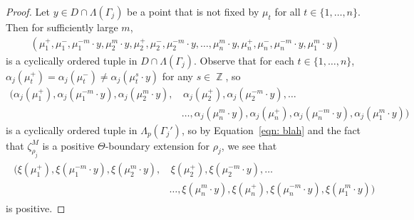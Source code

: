 \documentclass{amsart}
\theoremstyle{plain}
\theoremstyle{definition}
\DeclareMathOperator{\Zb}{\mathbb{Z}}
\newcommand{\1}{\mathbf{1}}
\begin{document}
\begin{proof}
Let $y\in D\cap\Lambda(\Gamma_j)$ be a point that is not fixed by $\mu_t$ for all $t\in\{1,\dots,n\}$. Then for sufficiently large $m$, 
\begin{align*}
(\mu_1^+,\mu_1^-,\mu_1^{-m}\cdot y,\mu_2^m\cdot y,\mu_2^+,\mu_2^-,\mu_2^{-m}\cdot y,\dots,\mu_n^m\cdot y,\mu_n^+,\mu_n^-,\mu_n^{-m}\cdot y,\mu_1^m\cdot y)    
\end{align*}
is a cyclically ordered tuple in $D\cap \Lambda(\Gamma_j)$. Observe that for each $t\in\{1,\dots,n\}$, $\alpha_j(\mu_t^+)=\alpha_j(\mu_t^-)\neq\alpha_j(\mu_t^s\cdot y)$ for any $s\in\Zb$, so
\begin{align*}
\big(\alpha_j(\mu_1^+),\alpha_j(\mu_1^{-m}\cdot y),\alpha_j(\mu_2^m\cdot y),&\,\alpha_j(\mu_2^+),\alpha_j(\mu_2^{-m}\cdot y),\dots\\
&\dots,\alpha_j(\mu_n^m\cdot y),\alpha_j(\mu_n^+),\alpha_j(\mu_n^{-m}\cdot y),\alpha_j(\mu_1^m\cdot y)\big)
\end{align*}
is a cyclically ordered tuple in $\Lambda_p(\Gamma_j')$, so by Equation~\eqref{eqn: blah} and the fact that $\zeta_{\rho_j}^M$ is a positive $\Theta$-boundary extension for $\rho_j$, we see that
\begin{align}\label{eqn: positive1}
\begin{split}
\big(\xi(\mu_1^+),\xi(\mu_1^{-m}\cdot y),\xi(\mu_2^m\cdot y),&\,\xi(\mu_2^+),\xi(\mu_2^{-m}\cdot y),\dots\\
&\dots,\xi(\mu_n^m\cdot y),\xi(\mu_n^+),\xi(\mu_n^{-m}\cdot y),\xi(\mu_1^m\cdot y)\big)
\end{split}
\end{align}
is positive. 


\end{proof}
\end{document}
